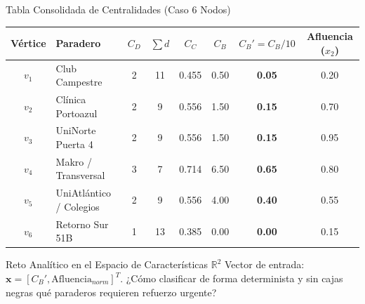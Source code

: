 \documentclass[aspectratio=169,10pt]{beamer}
\begin{document}
\begin{frame}{Tabla Consolidada de Centralidades (Caso 6 Nodos)}
    \centering
    \small
    \begin{tabular}{clcccccc}
        \toprule
        \textbf{Vértice} & \textbf{Paradero} & \textbf{$C_D$} & \textbf{$\sum d$} & \textbf{$C_C$} & \textbf{$C_B$} & \textbf{$C_B'=C_B/10$} & \textbf{Afluencia ($x_2$)} \\
        \midrule
        $v_1$ & Club Campestre & 2 & 11 & 0.455 & 0.50 & \textbf{0.05} & 0.20 \\
        $v_2$ & Clínica Portoazul & 2 & 9 & 0.556 & 1.50 & \textbf{0.15} & 0.70 \\
        $v_3$ & UniNorte Puerta 4 & 2 & 9 & 0.556 & 1.50 & \textbf{0.15} & 0.95 \\
        $v_4$ & Makro / Transversal & 3 & 7 & 0.714 & 6.50 & \textbf{0.65} & 0.80 \\
        $v_5$ & UniAtlántico / Colegios & 2 & 9 & 0.556 & 4.00 & \textbf{0.40} & 0.55 \\
        $v_6$ & Retorno Sur 51B & 1 & 13 & 0.385 & 0.00 & \textbf{0.00} & 0.15 \\
        \bottomrule
    \end{tabular}
    \vspace{0.4cm}
    \begin{alertblock}{Reto Analítico en el Espacio de Características $\mathbb{R}^2$}
        Vector de entrada: $\mathbf{x} = [C_B', \text{Afluencia}_{norm}]^T$. ¿Cómo clasificar de forma determinista y sin cajas negras qué paraderos requieren refuerzo urgente?
    \end{alertblock}
\end{frame}
\end{document}

